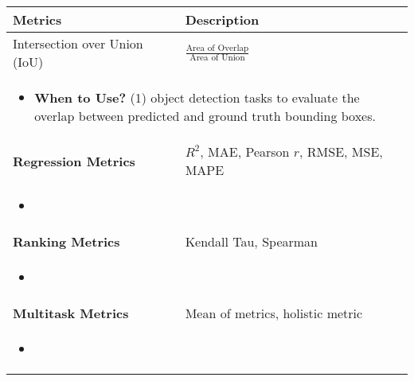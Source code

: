 \begin{summary}
    \begin{center}
        \begin{tabular}{ll}
        \toprule
        \textbf{Metrics} & \textbf{Description} \\
        \midrule
        Intersection over Union (IoU) & $\frac{\text{Area of Overlap}}{\text{Area of Union}}$ \\
        \multicolumn{2}{p{\linewidth}}{
            \begin{itemize}
                \item \textbf{When to Use?} (1) object detection tasks to evaluate the overlap between predicted and ground truth bounding boxes.
            \end{itemize}} \\
        \toprule
        \textbf{Regression Metrics} & $R^2$, MAE, Pearson $r$, RMSE, MSE, MAPE \\ 
        \multicolumn{2}{p{\linewidth}}{
        \begin{itemize}
            \item 
        \end{itemize}} \\
        \midrule
        \textbf{Ranking Metrics} & Kendall Tau, Spearman \\
        \multicolumn{2}{p{\linewidth}}{
        \begin{itemize}
            \item 
        \end{itemize}} \\
        \midrule
        \textbf{Multitask Metrics} & Mean of metrics, holistic metric \\
        \multicolumn{2}{p{\linewidth}}{
        \begin{itemize}
            \item 
        \end{itemize}} \\
        \bottomrule
        \end{tabular}
    \end{center}
\end{summary}
\newpage

